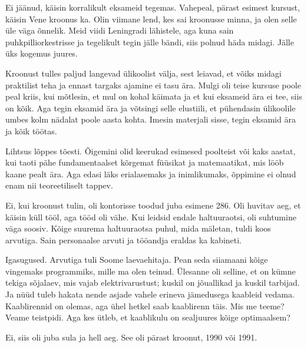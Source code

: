 
Ei jäänud, käisin korralikult eksameid tegemas. 
Vahepeal, pärast esimest kursust, käisin Vene kroonus ka. Olin viimane 
lend, kes sai kroonusse minna, ja olen selle üle väga õnnelik. Meid viidi Leningradi lähistele, aga kuna
sain puhkpilliorkestrisse ja tegelikult tegin jälle bändi, siis polnud häda midagi. 
Jälle üks kogemus juures. 

Kroonust tulles paljud langevad ülikoolist välja, sest leiavad, et võiks 
midagi praktilist teha ja ennast targaks ajamine ei tasu ära. Mulgi 
oli teise kursuse poole peal kriis, kui mõtlesin, et mul on kohal 
käimata ja et kui eksameid ära ei tee, siis on kõik. Aga tegin 
eksamid ära ja võtsingi selle elustiili, et pühendasin ülikoolile umbes 
kolm nädalat poole aasta kohta. Imesin materjali sisse, tegin eksamid ära ja 
kõik töötas. 


Lihtsus lõppes tõesti. Õigemini olid keerukad esimesed poolteist või kaks 
aastat, kui taoti pähe fundamentaalset kõrgemat füüsikat ja matemaatikat, mis lööb kaane pealt ära. Aga edasi läks erialasemaks 
ja inimlikumaks, õppimine ei olnud enam nii teoreetiliselt tappev. 


Ei, kui kroonust tulin, oli kontorisse toodud juba esimene 286. Oli huvitav aeg, et käisin küll 
tööl, aga tööd oli vähe. Kui 
leidsid endale haltuuraotsi, oli suhtumine väga soosiv. Kõige suurema haltuuraotsa puhul, 
mida mäletan, tuldi koos arvutiga. Sain personaalse arvuti ja 
tööandja eraldas ka kabineti. 


Igasugused. Arvutiga tuli Soome laevaehitaja. 
Pean seda siiamaani kõige vingemaks programmiks, mille ma olen teinud. Ülesanne 
oli selline, et on kümne tekiga sõjalaev, mis vajab 
elektrivarustust; kuskil on jõuallikad ja kuskil tarbijad. Ja nüüd tuleb
hakata nende asjade vahele erineva jämedusega kaableid vedama. Kaablirennid 
on olemas, aga ühel hetkel saab kaablirenn täis. Mis me teeme? Veame 
teistpidi. Aga kes ütleb, et kaablikulu on sealjuures kõige optimaalsem? 


Ei, siis oli juba sula ja hell aeg. See oli pärast kroonut, 1990 või 1991.

